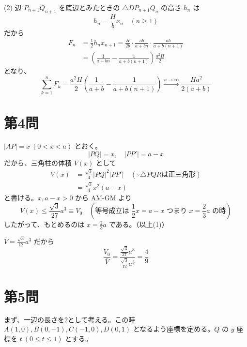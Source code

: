 \documentclass[../main.tex]{subfiles}
\begin{document}
\noindent
(2) 辺 $P_{n+1} Q_{n+1}$ を底辺とみたときの $\triangle D P_{n+1} Q_n$ の高さ $h_n$ は
\[
  h_n = \frac{H}{b} x_n \quad (n \ge 1)
\]
だから
\begin{align*}
  F_n &= \frac{1}{2} h_n x_{n+1} = \frac{H}{2b} \cdot \frac{ab}{a+bn} \cdot \frac{ab}{a+b(n+1)} \\
  &= \left( \frac{1}{a+bn} - \frac{1}{a+b(n+1)} \right) \frac{a^2 H}{2}
\end{align*}
となり、
\[
  \sum_{k=1}^n F_k = \frac{a^2 H}{2} \left( \frac{1}{a+b} - \frac{1}{a+b(n+1)} \right) \xrightarrow{n \to \infty} \frac{H a^2}{2(a+b)}
\]

\newpage

\section*{第4問}

\noindent
[\textbf{解}] $|AP| = x \ (0 < x < a)$ とおく。
\[
  |PQ| = x, \quad |PP'| = a-x
\]
だから、三角柱の体積 $V(x)$ として
\begin{align*}
  V(x) &= \frac{\sqrt{3}}{4} |PQ|^2 |PP'| \quad (\because \triangle PQR \text{は正三角形}) \\
  &= \frac{\sqrt{3}}{4} x^2 (a-x)
\end{align*}
と書ける。$x, a-x > 0$ から AM-GM より
\[
  V(x) \le \frac{\sqrt{3}}{27} a^3 \equiv V_0 \quad \left(\text{等号成立は } \frac{1}{2}x = a-x \text{ つまり } x = \frac{2}{3}a \text{ の時}\right)
\]
したがって、もとめるのは $x = \frac{2}{3}a$ である。（以上(1)）

\noindent
$\bar{V} = \frac{\sqrt{3}}{12} a^3$
だから
\[
  \frac{V_0}{\bar{V}} = \frac{\frac{\sqrt{3}}{27} a^3}{\frac{\sqrt{3}}{12} a^3} = \frac{4}{9}
\]

\newpage

\section*{第5問}

\noindent
[\textbf{解}] まず、一辺の長さを2として考える。この時 $A(1,0), B(0,-1), C(-1,0), D(0,1)$ となるよう座標を定める。$Q$ の $y$ 座標を $t \ (0 \le t \le 1)$ とする。
\end{document}
